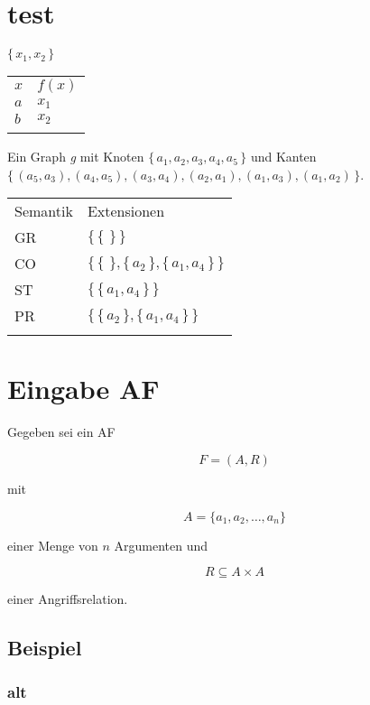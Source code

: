 \section{test}\label{test}

$\{\,x_1,x_2\,\} $

\begin{longtable}[c]{@{}ll@{}}
\toprule\addlinespace
$x$ & $f(x)$
\\\addlinespace
\midrule\endhead
$a$ & $x_1$
\\\addlinespace
$b$ & $x_2$
\\\addlinespace
\bottomrule
\end{longtable}

Ein Graph \emph{g} mit Knoten $\{\,a_1,a_2,a_3,a_4,a_5\,\} $ und Kanten
$\{\,(a_5,a_3),(a_4,a_5),(a_3,a_4),(a_2,a_1),(a_1,a_3),(a_1,a_2)\,\} $.

\begin{longtable}[c]{@{}ll@{}}
\toprule\addlinespace
Semantik & Extensionen
\\\addlinespace
\midrule\endhead
GR & $\{\,\{\,\,\}\,\} $
\\\addlinespace
CO & $\{\,\{\,\,\},\{\,a_2\,\},\{\,a_1,a_4\,\}\,\} $
\\\addlinespace
ST & $\{\,\{\,a_1,a_4\,\}\,\} $
\\\addlinespace
PR & $\{\,\{\,a_2\,\},\{\,a_1,a_4\,\}\,\} $
\\\addlinespace
\bottomrule
\end{longtable}

\section{Eingabe AF}\label{eingabe-af}

Gegeben sei ein AF

\[ F = (A,R) \]

mit

\[ A = \{a_1,a_2,\dots,a_n\} \]

einer Menge von $n$ Argumenten und

\[ R \subseteq A \times A \]

einer Angriffsrelation.

\subsection{Beispiel}\label{beispiel}

\subsubsection{alt}\label{alt}

